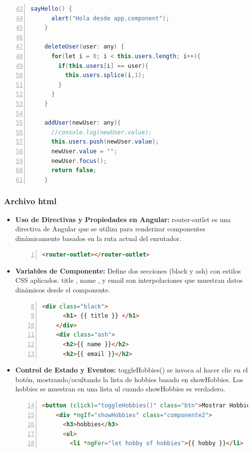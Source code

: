 \documentclass{article}
\begin{document}
\begin{itemize}
\begin{lstlisting}[language=java, numbers=left, firstnumber=43, numberstyle=\color{black}]
    sayHello() {
      alert("Hola desde app.component");
    }
    
    deleteUser(user: any) {
      for(let i = 0; i < this.users.length; i++){
        if(this.users[i] == user){
          this.users.splice(i,1);
        }
      }
    }
    
    addUser(newUser: any){
      //console.log(newUser.value);
      this.users.push(newUser.value);
      newUser.value = '';
      newUser.focus();
      return false;
    }
    \end{lstlisting}
  \end{itemize}
  
  \subsubsection{Archivo html}
  \begin{itemize}
    \item \textbf{Uso de Directivas y Propiedades en Angular: }router-outlet es una directiva de Angular que se utiliza 
    para renderizar componentes dinámicamente basados en la ruta actual del enrutador.
    \begin{lstlisting}[language=html, numbers=left, firstnumber=1, numberstyle=\color{orange}]
    <router-outlet></router-outlet>
    \end{lstlisting}
    \item \textbf{Variables de Componente: }Define dos secciones (black y ash) con estilos CSS aplicados. {{ title }}, 
    {{ name }}, y {{ email }} son interpolaciones que muestran datos dinámicos desde el componente.
    \begin{lstlisting}[language=html, numbers=left, firstnumber=8, numberstyle=\color{orange}]
    <div class="black">
      <h1> {{ title }} </h1>
    </div>
    <div class="ash">
      <h2>{{ name }}</h2>
      <h2>{{ email }}</h2>
    \end{lstlisting}
    \item \textbf{Control de Estado y Eventos: }toggleHobbies() se invoca al hacer clic en el botón, mostrando/ocultando 
    la lista de hobbies basado en showHobbies. Los hobbies se muestran en una lista ul cuando showHobbies es verdadero.
    \begin{lstlisting}[language=html, numbers=left, firstnumber=14, numberstyle=\color{orange}]
    <button (click)="toggleHobbies()" class="btn">Mostrar Hobbies</button>
    <div *ngIf="showHobbies" class="componente2">
      <h3>hobbies</h3>
      <ul>
        <li *ngFor="let hobby of hobbies">{{ hobby }}</li>

\end{lstlisting}
\end{itemize}
\end{document}
